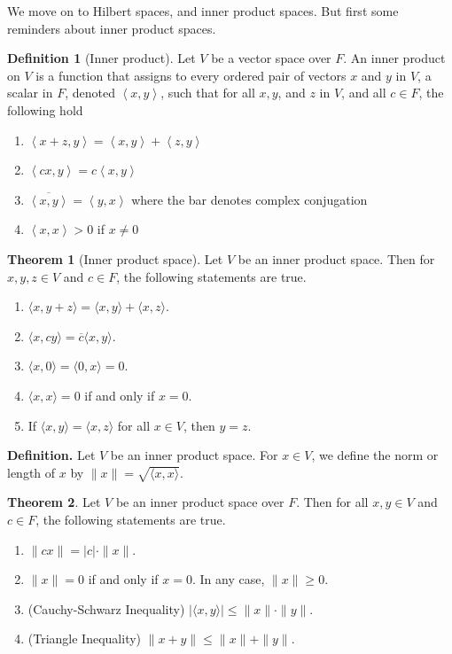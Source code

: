 \documentclass[12pt]{article}
\theoremstyle{definition}
\newtheorem{theorem}{Theorem}[section]
\newtheorem{definition}{Definition}[section]
\newcommand{\inprod}[1]{\left\langle #1 \right\rangle}
\begin{document}
We move on to Hilbert spaces, and inner product spaces. But first some reminders about inner product spaces. 
\begin{definition}[Inner product]
	Let $V$ be a vector space over $F$. An inner product on $V$ is a function that assigns to every ordered pair of vectors $x$ and $y$ in $V$, a scalar in $F$, denoted $\inprod{x,y}$, such that for all $x,y$, and $z$ in $V$, and all $c \in F$, the following hold
	\begin{enumerate}
		\item $\inprod{x+z,y} = \inprod{x,y} + \inprod{z,y}$
		\item $\inprod{cx,y} = c\inprod{x,y}$
		\item $\overline{\inprod{x,y}} = \inprod{y,x}$ where the bar denotes complex conjugation
		\item $\inprod{x,x} > 0$ if $x \neq 0 $
	\end{enumerate} 
	
\end{definition}
	\begin{theorem}[Inner product space]
Let \( V \) be an inner product space. Then for \( x, y, z \in V \) and \( c \in F \), the following statements are true.
\begin{enumerate}
\item[(a)] \( \langle x, y + z \rangle = \langle x, y \rangle + \langle x, z \rangle \).
\item[(b)] \( \langle x, cy \rangle = \overline{c} \langle x, y \rangle \).
\item[(c)] \( \langle x, 0 \rangle = \langle 0, x \rangle = 0 \).
\item[(d)] \( \langle x, x \rangle = 0 \) if and only if \( x = 0 \).
\item[(e)] If \( \langle x, y \rangle = \langle x, z \rangle \) for all \( x \in V \), then \( y = z \).
\end{enumerate}
\end{theorem}
\textbf{Definition.} Let \( V \) be an inner product space. For \( x \in V \), we define the norm or length of \( x \) by \( \lVert x \rVert = \sqrt{\langle x, x \rangle} \).


\begin{theorem} Let \( V \) be an inner product space over \( F \). Then for all \( x, y \in V \) and \( c \in F \), the following statements are true.
\begin{enumerate}
\item \( \|cx\| = |c| \cdot \|x\| \).
\item \( \|x\| = 0 \) if and only if \( x = 0 \). In any case, \( \|x\| \geq 0 \).
\item (Cauchy-Schwarz Inequality) \( |\langle x, y \rangle| \leq \|x\| \cdot \|y\| \).
\item (Triangle Inequality) \( \|x + y\| \leq \|x\| + \|y\| \).
\end{enumerate}
\end{theorem}
\end{document}
